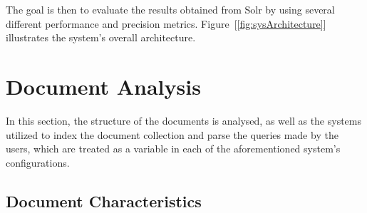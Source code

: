 \documentclass[sigconf]{acmart}
\begin{document}
The goal is then to evaluate the results obtained from Solr by using several different performance and precision metrics. Figure~[\ref{fig:sysArchitecture}] illustrates the system's overall architecture.

\section{Document Analysis}

In this section, the structure of the documents is analysed, as well as the systems utilized to index the document collection and parse the queries made by the users, which are treated as a variable in each of the aforementioned system's configurations.

\subsection{Document Characteristics}
\end{document}
